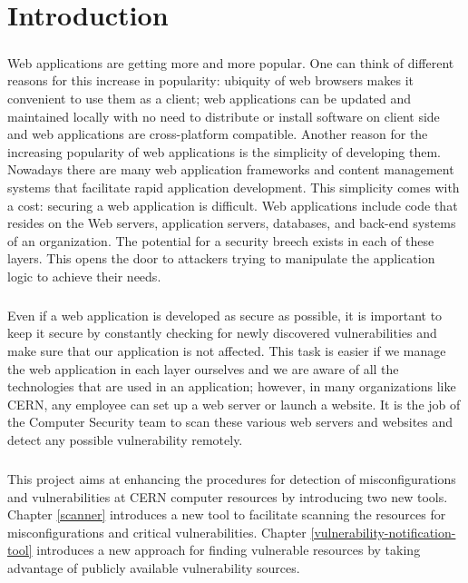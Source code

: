 \chapter{Introduction}
\label{introduction}
\thispagestyle{empty}
\paragraph{}
Web applications are getting more and more popular. One can think of different reasons for this increase in popularity: ubiquity of web browsers makes it convenient to use them as a client; web applications can be updated and maintained locally with no need to distribute or install software on client side and web applications are cross-platform compatible.
Another reason for the increasing popularity of web applications is the simplicity of developing them. Nowadays there are many web application frameworks and content management systems that facilitate rapid application development. This simplicity comes with a cost: securing a web application is difficult. Web applications include code that resides on the Web servers, application servers, databases, and back-end systems of an organization. The potential for a security breech exists in each of these layers. This opens the door to attackers trying to manipulate the application logic to achieve their needs\cite{secure_web}.
\paragraph{}
Even if a web application is developed as secure as possible, it is important to keep it secure by constantly checking for newly discovered vulnerabilities and make sure that our application is not affected. This task is easier if we manage the web application in each layer ourselves and we are aware of all the technologies that are used in an application; however, in many organizations like CERN, any employee can set up a web server or launch a website. It is the job of the Computer Security team to scan these various web servers and websites and detect any possible vulnerability remotely.
\paragraph{}
This project aims at enhancing the procedures for detection of misconfigurations and vulnerabilities at CERN computer resources by introducing two new tools. Chapter \ref{scanner} introduces a new tool to facilitate scanning the resources for misconfigurations and critical vulnerabilities. Chapter \ref{vulnerability-notification-tool} introduces a new approach for finding vulnerable resources by taking advantage of publicly available vulnerability sources.

